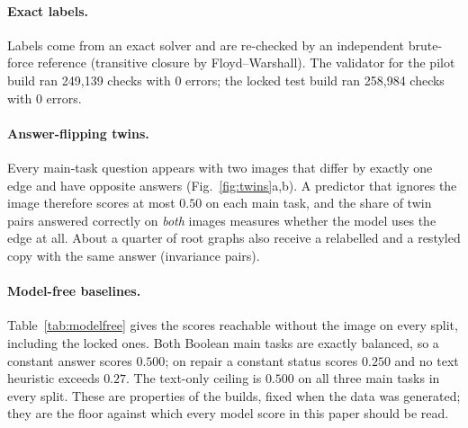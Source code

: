 \paragraph{Exact labels.}
Labels come from an exact solver and are re-checked by an independent brute-force reference
(transitive closure by Floyd--Warshall). The validator for the pilot build ran 249{,}139
checks with 0 errors; the locked test build ran 258{,}984 checks with 0 errors.

\paragraph{Answer-flipping twins.}
Every main-task question appears with two images that differ by exactly one edge and have
opposite answers (Fig.~\ref{fig:twins}a,b). A predictor that ignores the image therefore
scores at most $0.50$ on each main task, and the share of twin pairs answered correctly on
\emph{both} images measures whether the model uses the edge at all. About a quarter of root
graphs also receive a relabelled and a restyled copy with the same answer (invariance pairs).

\begin{table}[h]
\centering

\caption{Model-free baselines per split, computed by the validator with the real scorer from labels and
instructions alone (no model is involved). \emph{const.}: the better of the two constant answers
(\emph{true}/\emph{false}; for repair \emph{unchanged}/\emph{impossible}), i.e.\ the majority-class
score. \emph{heur.}: the best of three text heuristics for repair (add the edge the goal names, add the
first listed edge, remove the edge named by the first forbidden pair). \emph{text}: the best accuracy of
any predictor that sees the instruction but not the image. Counted on the root and edited images only.}
\label{tab:modelfree}
\end{table}

\paragraph{Model-free baselines.}
Table~\ref{tab:modelfree} gives the scores reachable without the image on every split, including the
locked ones. Both Boolean main tasks are exactly balanced, so a constant answer scores $0.500$; on repair
a constant status scores $0.250$ and no text heuristic exceeds $0.27$. The text-only ceiling is $0.500$
on all three main tasks in every split. These are properties of the builds, fixed when the data was
generated; they are the floor against which every model score in this paper should be read.

